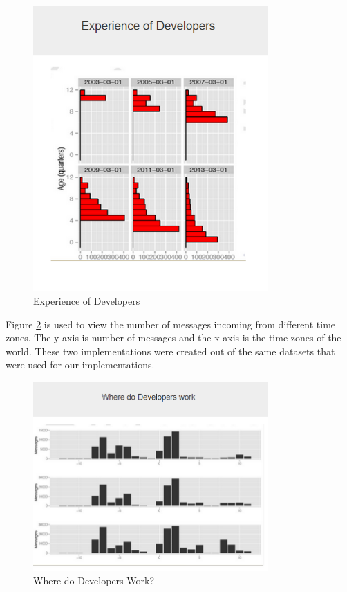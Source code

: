 \documentclass[seploa]{beavtex}
\begin{document}
\begin{figure}[H]
\begin{center}
\includegraphics[width=90mm]{image11.PNG}
\end{center}
\caption{Experience of Developers}
\label{fig:devExp}
\end{figure}

Figure \ref{fig:devWork} is used to view the number of messages incoming from different time zones. The y axis is number of messages and the x axis is the time zones of the world. These two implementations were created out of the same datasets that were used for our implementations.

\begin{figure}[H]
\begin{center}
\includegraphics[width=90mm]{image12.PNG}
\end{center}
\caption{Where do Developers Work?}
\label{fig:devWork}
\end{figure}
\end{document}

